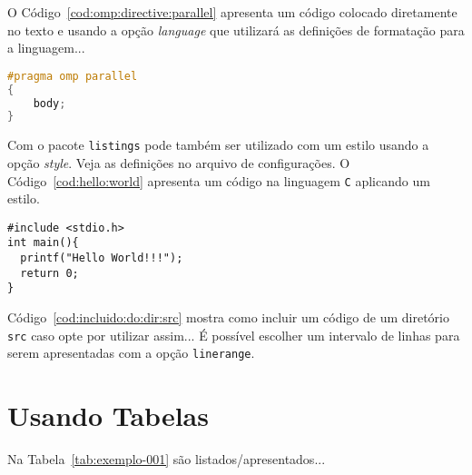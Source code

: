 O Código~\ref{cod:omp:directive:parallel} apresenta um código colocado diretamente no texto e usando a opção \textit{language} que utilizará as definições de formatação para a linguagem...

\begin{lstlisting}[language=C, basicstyle=\small, label=cod:omp:directive:parallel, caption={Parallel directive format}]
#pragma omp parallel
{
	body;
}
\end{lstlisting}

Com o pacote \texttt{listings} pode também ser utilizado com um estilo usando a opção \textit{style}. Veja as definições no arquivo de configurações. O Código~\ref{cod:hello:world} apresenta um código na linguagem \texttt{C} aplicando um estilo.

\begin{lstlisting}[style=C, label=cod:hello:world, caption={Hello World Estilizado}]
#include <stdio.h>
int main(){
  printf("Hello World!!!");
  return 0;
}
\end{lstlisting}

Código~\ref{cod:incluido:do:dir:src} mostra como incluir um código de um diretório \texttt{src} caso opte por utilizar assim... É possível escolher um intervalo de linhas para serem apresentadas com a opção \texttt{linerange}.




\section{Usando Tabelas}
\label{cap:conceitos:sec:usando:tabelas}

Na Tabela~\ref{tab:exemplo-001} são listados/apresentados...

